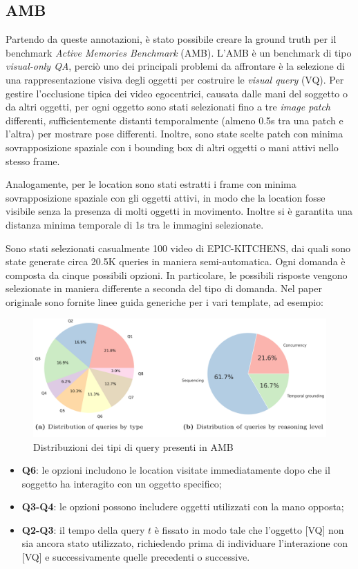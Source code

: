 \subsection*{AMB}
Partendo da queste annotazioni, è stato possibile creare la ground truth per il benchmark \emph{Active Memories Benchmark} (AMB). L'AMB è un benchmark di tipo \emph{visual-only QA}, perciò uno dei principali problemi da affrontare è la selezione di una rappresentazione visiva degli oggetti per costruire le \emph{visual query} (VQ). Per gestire l'occlusione tipica dei video egocentrici, causata dalle mani del soggetto o da altri oggetti, per ogni oggetto sono stati selezionati fino a tre \emph{image patch} differenti, sufficientemente distanti temporalmente (almeno 0.5s tra una patch e l'altra) per mostrare pose differenti. Inoltre, sono state scelte patch con minima sovrapposizione spaziale con i bounding box di altri oggetti o mani attivi nello stesso frame.

Analogamente, per le location sono stati estratti i frame con minima sovrapposizione spaziale con gli oggetti attivi, in modo che la location fosse visibile senza la presenza di molti oggetti in movimento. Inoltre si è garantita una distanza minima temporale di 1s tra le immagini selezionate.  

Sono stati selezionati casualmente 100 video di EPIC-KITCHENS, dai quali sono state generate circa 20.5K queries in maniera semi-automatica. Ogni domanda è composta da cinque possibili opzioni. In particolare, le possibili risposte vengono selezionate in maniera differente a seconda del tipo di domanda. Nel paper originale sono fornite linee guida generiche per i vari template, ad esempio:

\begin{figure}[ht]
    \centering
    \includegraphics[width=0.7\linewidth]{Images/amb_stats.png}
    \caption{Distribuzioni dei tipi di query presenti in AMB}
    \label{fig:amb_stats0}
\end{figure}

\begin{itemize}
    \item \textbf{Q6}: le opzioni includono le location visitate immediatamente dopo che il soggetto ha interagito con un oggetto specifico;
    \item \textbf{Q3-Q4}: le opzioni possono includere oggetti utilizzati con la mano opposta;
    \item \textbf{Q2-Q3}: il tempo della query $t$ è fissato in modo tale che l'oggetto [VQ] non sia ancora stato utilizzato, richiedendo prima di individuare l'interazione con [VQ] e successivamente quelle precedenti o successive.
\end{itemize}

